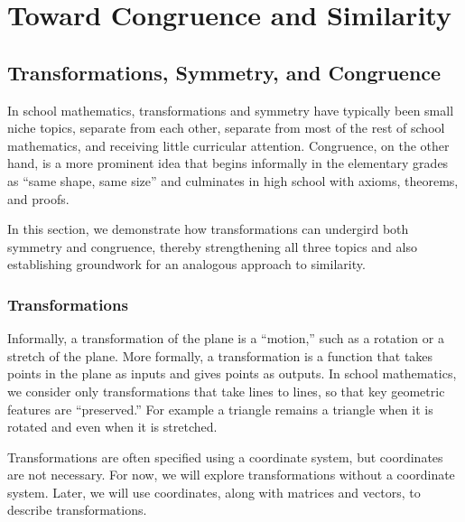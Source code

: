 
\chapter{Toward Congruence and Similarity}  


\section{Transformations, Symmetry, and Congruence}
In school mathematics, transformations and symmetry have typically been small niche topics, separate from each other, separate from most of the rest of school mathematics, and receiving little curricular attention.  Congruence, on the other hand, is a more prominent idea that begins informally in the elementary grades as ``same shape, same size'' and culminates in high school with axioms, theorems, and proofs.  

In this section, we demonstrate how transformations can undergird both symmetry and congruence, thereby strengthening all three topics and also establishing groundwork for an analogous approach to similarity.  

\subsection{Transformations}
Informally, a transformation of the plane is a ``motion,'' such as a rotation or a stretch of the plane.  More formally, a transformation is a function that takes points in the plane as inputs and gives points as outputs.  In school mathematics, we consider only transformations that take lines to lines, so that key geometric features are ``preserved.''  For example a triangle remains a triangle when it is rotated and even when it is stretched.  

Transformations are often specified using a coordinate system, but coordinates are not necessary.  For now, we will explore transformations without a coordinate system.  Later, we will use coordinates, along with matrices and vectors, to describe transformations.  

